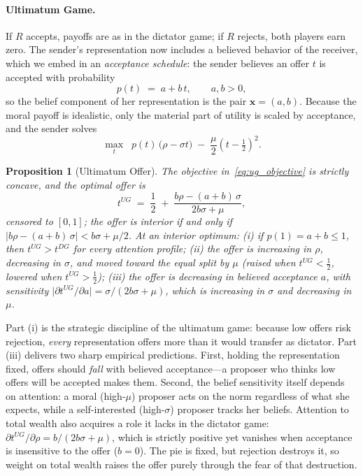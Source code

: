 \documentclass[11pt]{article}
\theoremstyle{plain}
\newtheorem{proposition}{Proposition}
\theoremstyle{remark}
\begin{document}
\paragraph{Ultimatum Game.} If $R$ accepts, payoffs are as in the dictator game; if $R$ rejects, both players earn zero. The sender's representation now includes a believed behavior of the receiver, which we embed in an \emph{acceptance schedule}: the sender believes an offer $t$ is accepted with probability
\begin{equation*}
p(t)\;=\;a+b\,t, \qquad a,b>0,
\end{equation*}
so the belief component of her representation is the pair $\mathbf{x}=(a,b)$. Because the moral payoff is idealistic, only the material part of utility is scaled by acceptance, and the sender solves
\begin{equation}
\max_{t}\;\; p(t)\,\bigl(\rho-\sigma t\bigr)\;-\;\frac{\mu}{2}\left(t-\tfrac12\right)^{2}.
\label{eq:ug_objective}
\end{equation}

\begin{proposition}[Ultimatum Offer]
\label{prop:ug}
The objective in~\eqref{eq:ug_objective} is strictly concave, and the optimal offer is
\begin{equation}
t^{UG}\;=\;\frac12\;+\;\frac{b\rho-(a+b)\,\sigma}{2b\sigma+\mu},
\label{eq:ug_offer}
\end{equation}
censored to $[0,1]$; the offer is interior if and only if $\bigl|b\rho-(a+b)\,\sigma\bigr|<b\sigma+\mu/2$. At an interior optimum: (i) if $p(1)=a+b\le 1$, then $t^{UG}>t^{DG}$ for every attention profile; (ii) the offer is increasing in $\rho$, decreasing in $\sigma$, and moved toward the equal split by $\mu$ (raised when $t^{UG}<\tfrac12$, lowered when $t^{UG}>\tfrac12$); (iii) the offer is decreasing in believed acceptance $a$, with sensitivity $\bigl|\partial t^{UG}/\partial a\bigr|=\sigma/(2b\sigma+\mu)$, which is increasing in $\sigma$ and decreasing in $\mu$.
\end{proposition}

Part (i) is the strategic discipline of the ultimatum game: because low offers risk rejection, \emph{every} representation offers more than it would transfer as dictator. Part (iii) delivers two sharp empirical predictions. First, holding the representation fixed, offers should \emph{fall} with believed acceptance---a proposer who thinks low offers will be accepted makes them. Second, the belief sensitivity itself depends on attention: a moral (high-$\mu$) proposer acts on the norm regardless of what she expects, while a self-interested (high-$\sigma$) proposer tracks her beliefs. Attention to total wealth also acquires a role it lacks in the dictator game: $\partial t^{UG}/\partial\rho=b/(2b\sigma+\mu)$, which is strictly positive yet vanishes when acceptance is insensitive to the offer ($b=0$). The pie is fixed, but rejection destroys it, so weight on total wealth raises the offer purely through the fear of that destruction. 
\end{document}
